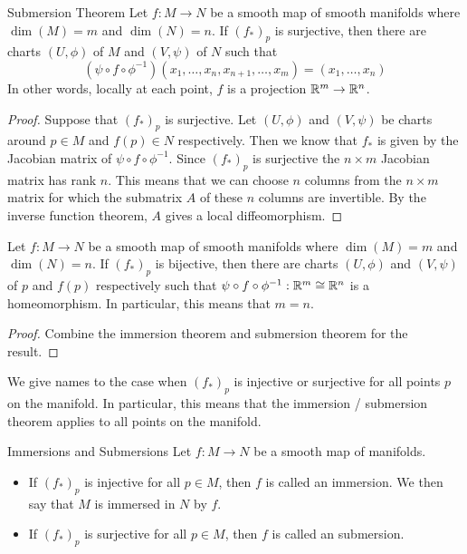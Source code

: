 \documentclass[a4paper]{article}
\begin{document}
\begin{thm}{Submersion Theorem}{} Let $f:M\to N$ be a smooth map of smooth manifolds where $\dim(M)=m$ and $\dim(N)=n$. If $(f_\ast)_p$ is surjective, then there are charts $(U,\phi)$ of $M$ and $(V,\psi)$ of $N$ such that $$(\psi\circ f\circ\phi^{-1})(x_1,\dots,x_n,x_{n+1},\dots,x_m)=(x_1,\dots,x_n)$$ In other words, locally at each point, $f$ is a projection $\mathbb{R}^m\to\mathbb{R}^n$. \tcbline
\begin{proof}
Suppose that $(f_\ast)_p$ is surjective. Let $(U,\phi)$ and $(V,\psi)$ be charts around $p\in M$ and $f(p)\in N$ respectively. Then we know that $f_\ast$ is given by the Jacobian matrix of $\psi\circ f\circ\phi^{-1}$. Since $(f_\ast)_p$ is surjective the $n\times m$ Jacobian matrix has rank $n$. This means that we can choose $n$ columns from the $n\times m$ matrix for which the submatrix $A$ of these $n$ columns are invertible. By the inverse function theorem, $A$ gives a local diffeomorphism. 
\end{proof}
\end{thm}

\begin{crl}{}{} Let $f:M\to N$ be a smooth map of smooth manifolds where $\dim(M)=m$ and $\dim(N)=n$. If $(f_\ast)_p$ is bijective, then there are charts $(U,\phi)$ and $(V,\psi)$ of $p$ and $f(p)$ respectively such that $\psi\circ f\circ\phi^{-1}:\mathbb{R}^m\cong\mathbb{R}^n$ is a homeomorphism. In particular, this means that $m=n$. \tcbline
\begin{proof}
Combine the immersion theorem and submersion theorem for the result. 
\end{proof}
\end{crl}

We give names to the case when $(f_\ast)_p$ is injective or surjective for all points $p$ on the manifold. In particular, this means that the immersion / submersion theorem applies to all points on the manifold. 

\begin{defn}{Immersions and Submersions}{} Let $f:M\to N$ be a smooth map of manifolds. 
\begin{itemize}
\item If $(f_\ast)_p$ is injective for all $p\in M$, then $f$ is called an immersion. We then say that $M$ is immersed in $N$ by $f$. 
\item If $(f_\ast)_p$ is surjective for all $p\in M$, then $f$ is called an submersion. 
\end{itemize}
\end{defn}
\end{document}
